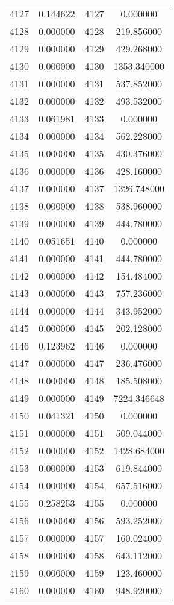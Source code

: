 \documentclass[12pt]{article}
\begin{document}
\begin{longtable}{@{}cccc@{}}
4127 & 0.144622 & 4127 & 0.000000 \\
4128 & 0.000000 & 4128 & 219.856000 \\
4129 & 0.000000 & 4129 & 429.268000 \\
4130 & 0.000000 & 4130 & 1353.340000 \\
4131 & 0.000000 & 4131 & 537.852000 \\
4132 & 0.000000 & 4132 & 493.532000 \\
4133 & 0.061981 & 4133 & 0.000000 \\
4134 & 0.000000 & 4134 & 562.228000 \\
4135 & 0.000000 & 4135 & 430.376000 \\
4136 & 0.000000 & 4136 & 428.160000 \\
4137 & 0.000000 & 4137 & 1326.748000 \\
4138 & 0.000000 & 4138 & 538.960000 \\
4139 & 0.000000 & 4139 & 444.780000 \\
4140 & 0.051651 & 4140 & 0.000000 \\
4141 & 0.000000 & 4141 & 444.780000 \\
4142 & 0.000000 & 4142 & 154.484000 \\
4143 & 0.000000 & 4143 & 757.236000 \\
4144 & 0.000000 & 4144 & 343.952000 \\
4145 & 0.000000 & 4145 & 202.128000 \\
4146 & 0.123962 & 4146 & 0.000000 \\
4147 & 0.000000 & 4147 & 236.476000 \\
4148 & 0.000000 & 4148 & 185.508000 \\
4149 & 0.000000 & 4149 & 7224.346648 \\
4150 & 0.041321 & 4150 & 0.000000 \\
4151 & 0.000000 & 4151 & 509.044000 \\
4152 & 0.000000 & 4152 & 1428.684000 \\
4153 & 0.000000 & 4153 & 619.844000 \\
4154 & 0.000000 & 4154 & 657.516000 \\
4155 & 0.258253 & 4155 & 0.000000 \\
4156 & 0.000000 & 4156 & 593.252000 \\
4157 & 0.000000 & 4157 & 160.024000 \\
4158 & 0.000000 & 4158 & 643.112000 \\
4159 & 0.000000 & 4159 & 123.460000 \\
4160 & 0.000000 & 4160 & 948.920000 \\

\end{longtable}
\end{document}
